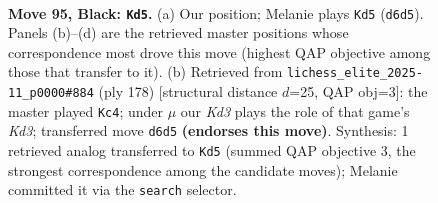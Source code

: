 \documentclass[11pt]{article}
\begin{document}
\begin{figure}[p]\centering
\begin{subfigure}{0.46\textwidth}\centering
\resizebox{\linewidth}{!}{%
\newchessgame
\chessboard[
  setfen={5r2/8/p2k4/P1p2p1p/1p3P1P/4P1P1/1P4K1/2R5 b - - 2 95},
  showmover=false,
  pgfstyle=straightmove, color=movearrow, markmove={d6-d5}
]}
\caption{}
\end{subfigure}\hfill
\begin{subfigure}{0.46\textwidth}\centering
\resizebox{\linewidth}{!}{%
\newchessgame
\chessboard[
  setfen={8/1p6/p1pr1kp1/P6p/1P3P1P/3KP3/8/1R6 w - - 15 90},
  showmover=false,
  pgfstyle=straightmove, color=movearrow, markmove={d3-c4}
]}
\caption{}
\end{subfigure}
\\[4pt]

\caption{\textbf{Move 95, Black: \texttt{Kd5}.} (a) Our position; Melanie plays \texttt{Kd5} (\texttt{d6d5}). Panels (b)--(d) are the retrieved master positions whose correspondence most drove this move (highest QAP objective among those that transfer to it). (b) Retrieved from \texttt{lichess\_elite\_2025-11\_p0000\#884} (ply 178) [structural distance $d$=25, QAP obj=3]: the master played \texttt{Kc4}; under $\mu$ our \emph{Kd3} plays the role of that game's \emph{Kd3}; transferred move \texttt{d6d5} \textbf{(endorses this move)}. Synthesis: 1 retrieved analog transferred to \texttt{Kd5} (summed QAP objective 3, the strongest correspondence among the candidate moves); Melanie committed it via the \texttt{search} selector.}
\label{fig:thought-m189}
\end{figure}

\clearpage
\end{document}
